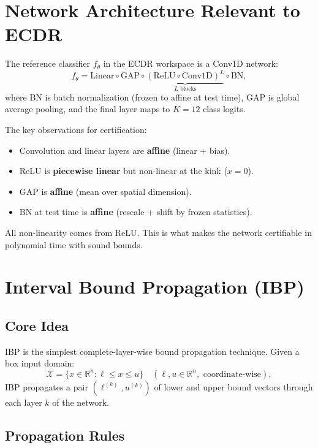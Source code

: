 \documentclass[11pt, a4paper]{article}
\theoremstyle{definition}
\theoremstyle{plain}
\newcommand{\R}{\mathbb{R}}
\begin{document}
\section{Network Architecture Relevant to ECDR}

The reference classifier $f_\theta$ in the ECDR workspace is a Conv1D network:
\[
  f_\theta = \text{Linear} \circ \text{GAP} \circ \underbrace{(\text{ReLU} \circ \text{Conv1D})^L}_{L \text{ blocks}} \circ \text{BN},
\]
where BN is batch normalization (frozen to affine at test time), GAP is
global average pooling, and the final layer maps to $K = 12$ class logits.

The key observations for certification:
\begin{itemize}[leftmargin=1.5em]
  \item Convolution and linear layers are \textbf{affine} (linear + bias).
  \item ReLU is \textbf{piecewise linear} but non-linear at the kink ($x = 0$).
  \item GAP is \textbf{affine} (mean over spatial dimension).
  \item BN at test time is \textbf{affine} (rescale + shift by frozen statistics).
\end{itemize}
All non-linearity comes from ReLU. This is what makes the network
certifiable in polynomial time with sound bounds.

\section{Interval Bound Propagation (IBP)}

\subsection{Core Idea}

IBP is the simplest complete-layer-wise bound propagation technique.
Given a box input domain:
\[
  \mathcal{X} = \bigl\{ x \in \R^n : \ell \le x \le u \bigr\}
  \quad (\ell, u \in \R^n, \text{ coordinate-wise}),
\]
IBP propagates a pair $(\ell^{(k)}, u^{(k)})$ of lower and upper bound vectors
through each layer $k$ of the network.

\subsection{Propagation Rules}
\end{document}
